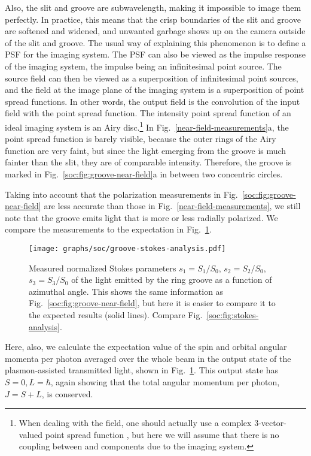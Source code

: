 Also, the slit and groove are subwavelength, making it impossible to image them perfectly.
In practice, this means that the crisp boundaries of the slit and groove are softened and widened, and unwanted garbage shows up on the camera outside of the slit and groove.
The usual way of explaining this phenomenon is to define a \gls{PSF} for the
imaging system.
The \gls{PSF} can also be viewed as the impulse response of the
imaging system, the impulse being an infinitesimal point source. The source field can then be viewed as a superposition of infinitesimal point sources, and the field at the image plane of the imaging system is a superposition of point spread functions.
In other words, the output field is the convolution of the input field with the point spread function.
The intensity point spread function of an ideal imaging system is an Airy disc.\footnote{When dealing with the field, one should actually use a complex 3-vector-valued point spread function \parencite{Marian2007}, but here we will assume that there is no coupling between  and  components due to the imaging system.}
In Fig.~\ref{near-field-measurements}a, the point spread function is barely visible, because the outer rings of the Airy function are very faint, but since the light emerging from the groove is much fainter than the slit, they are of comparable intensity.
Therefore, the groove is marked in Fig.~\ref{soc:fig:groove-near-field}a in between two concentric circles.

Taking into account that the polarization measurements in Fig.~\ref{soc:fig:groove-near-field} are less accurate than those in Fig.~\ref{near-field-measurements}, we still note that the groove emits light that is more or less radially polarized.
We compare the measurements to the expectation in Fig.~\ref{soc:fig:groove-stokes-analysis}.
%
\begin{figure}[tb]
  \centering\texttt{[image: graphs/soc/groove-stokes-analysis.pdf]}
  \caption{Measured normalized Stokes parameters $s_1=S_{1}/S_{0}$, $s_2=S_{2}/S_{0}$, $s_3=S_{3}/S_{0}$ of the light emitted by the ring groove as a function of azimuthal angle.
  This shows the same information as Fig.~\ref{soc:fig:groove-near-field}, but here it is easier to compare it to the expected results (solid lines).
  Compare Fig.~\ref{soc:fig:stokes-analysis}.}
  \label{soc:fig:groove-stokes-analysis}
\end{figure}%

Here, also, we calculate the expectation value of the spin and orbital angular momenta per photon averaged over the whole beam in the output state of the plasmon-assisted transmitted light, shown in Fig.~\ref{soc:fig:groove-stokes-analysis}.
This output state has $S = 0, L = \hbar$, again showing that the total angular momentum per photon, $J = S + L$, is conserved.

